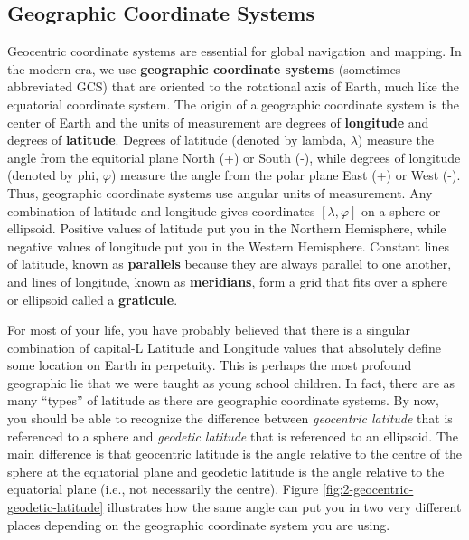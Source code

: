 \documentclass[
]{book}
\begin{document}
\subsection{Geographic Coordinate Systems}\label{geographic-coordinate-systems}

Geocentric coordinate systems are essential for global navigation and mapping. In the modern era, we use \textbf{geographic coordinate systems} (sometimes abbreviated GCS) that are oriented to the rotational axis of Earth, much like the equatorial coordinate system. The origin of a geographic coordinate system is the center of Earth and the units of measurement are degrees of \textbf{longitude} and degrees of \textbf{latitude}. Degrees of latitude (denoted by lambda, \(λ\)) measure the angle from the equitorial plane North (+) or South (-), while degrees of longitude (denoted by phi, \(φ\)) measure the angle from the polar plane East (+) or West (-). Thus, geographic coordinate systems use angular units of measurement. Any combination of latitude and longitude gives coordinates \([λ,φ]\) on a sphere or ellipsoid. Positive values of latitude put you in the Northern Hemisphere, while negative values of longitude put you in the Western Hemisphere. Constant lines of latitude, known as \textbf{parallels} because they are always parallel to one another, and lines of longitude, known as \textbf{meridians}, form a grid that fits over a sphere or ellipsoid called a \textbf{graticule}.

For most of your life, you have probably believed that there is a singular combination of capital-L Latitude and Longitude values that absolutely define some location on Earth in perpetuity. This is perhaps the most profound geographic lie that we were taught as young school children. In fact, there are as many ``types'' of latitude as there are geographic coordinate systems. By now, you should be able to recognize the difference between \emph{geocentric latitude} that is referenced to a sphere and \emph{geodetic latitude} that is referenced to an ellipsoid. The main difference is that geocentric latitude is the angle relative to the centre of the sphere at the equatorial plane and geodetic latitude is the angle relative to the equatorial plane (i.e., not necessarily the centre). Figure \ref{fig:2-geocentric-geodetic-latitude} illustrates how the same angle can put you in two very different places depending on the geographic coordinate system you are using.
\end{document}

